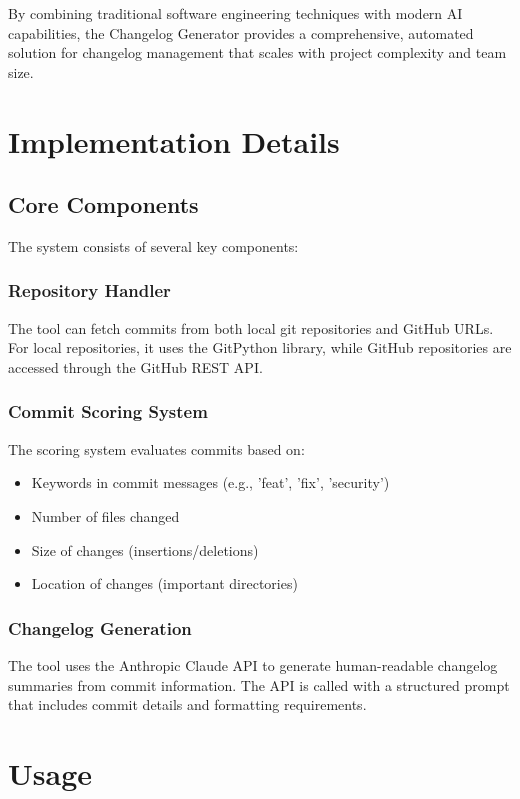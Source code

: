 \documentclass[sigconf]{acmart}
\begin{document}
By combining traditional software engineering techniques with modern AI capabilities, the Changelog Generator provides a comprehensive, automated solution for changelog management that scales with project complexity and team size.

\section{Implementation Details}

\subsection{Core Components}
The system consists of several key components:

\subsubsection{Repository Handler}
The tool can fetch commits from both local git repositories and GitHub URLs. For local repositories, it uses the GitPython library, while GitHub repositories are accessed through the GitHub REST API.

\subsubsection{Commit Scoring System}
The scoring system evaluates commits based on:
\begin{itemize}
    \item Keywords in commit messages (e.g., 'feat', 'fix', 'security')
    \item Number of files changed
    \item Size of changes (insertions/deletions)
    \item Location of changes (important directories)
\end{itemize}

\subsubsection{Changelog Generation}
The tool uses the Anthropic Claude API to generate human-readable changelog summaries from commit information. The API is called with a structured prompt that includes commit details and formatting requirements.

\section{Usage}
\end{document}
